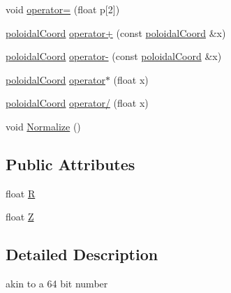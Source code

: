 \begin{DoxyCompactItemize}
void \hyperlink{classpoloidalCoord_ae00ac97cf9ae58b78a089b95da2fe483}{operator=} (float p\mbox{[}2\mbox{]})
\item 
\hyperlink{classpoloidalCoord}{poloidalCoord} \hyperlink{classpoloidalCoord_acec02c0ef6a0f2d04391bc568450500e}{operator+} (const \hyperlink{classpoloidalCoord}{poloidalCoord} \&x)
\item 
\hyperlink{classpoloidalCoord}{poloidalCoord} \hyperlink{classpoloidalCoord_ac1461c792758b6416b8bc36f1e81a899}{operator-\/} (const \hyperlink{classpoloidalCoord}{poloidalCoord} \&x)
\item 
\hyperlink{classpoloidalCoord}{poloidalCoord} \hyperlink{classpoloidalCoord_aa0ba78746c12ae4615eecda5fb6dbd1a}{operator$\ast$} (float x)
\item 
\hyperlink{classpoloidalCoord}{poloidalCoord} \hyperlink{classpoloidalCoord_a48b4ef842162fa8a9b11bfb36eb9e9b9}{operator/} (float x)
\item 
void \hyperlink{classpoloidalCoord_a2713f3070c42d21a4d2b927d8b697a9c}{Normalize} ()
\end{DoxyCompactItemize}
\subsection*{Public Attributes}
\begin{DoxyCompactItemize}
\item 
float \hyperlink{classpoloidalCoord_aabe27b2d24f9219eb3a742356a308c83}{R}
\item 
float \hyperlink{classpoloidalCoord_aaf36de74eb60396dc9839b0d1b56abf3}{Z}
\end{DoxyCompactItemize}


\subsection{Detailed Description}
akin to a 64 bit number 

